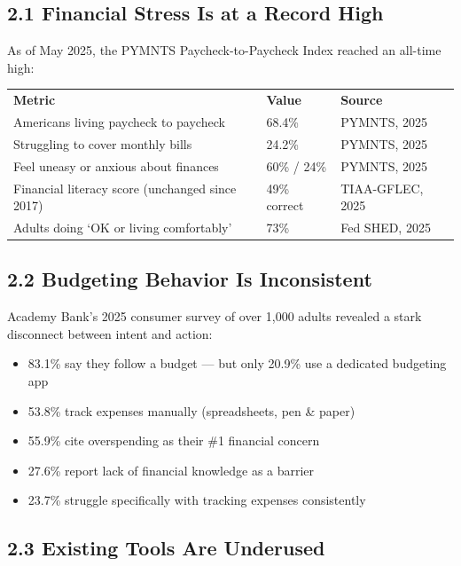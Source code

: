 \documentclass[11pt,a4paper]{article}
\begin{document}
\subsection{2.1 Financial Stress Is at a Record High}

As of May 2025, the PYMNTS Paycheck-to-Paycheck Index reached an all-time high:

\vspace{0.5em}
\begin{tabularx}{\textwidth}{L{7cm} L{3.5cm} L{4.5cm}}
\color{white}\textbf{Metric} & \color{white}\textbf{Value} & \color{white}\textbf{Source} \\
Americans living paycheck to paycheck & 68.4\% & PYMNTS, 2025 \\
Struggling to cover monthly bills & 24.2\% & PYMNTS, 2025 \\
Feel uneasy or anxious about finances & 60\% / 24\% & PYMNTS, 2025 \\
Financial literacy score (unchanged since 2017) & 49\% correct & TIAA-GFLEC, 2025 \\
Adults doing `OK or living comfortably' & 73\% & Fed SHED, 2025 \\
\end{tabularx}
\vspace{0.5em}

\subsection{2.2 Budgeting Behavior Is Inconsistent}

Academy Bank's 2025 consumer survey of over 1,000 adults revealed a stark disconnect
between intent and action:

\begin{itemize}
  \item 83.1\% say they follow a budget --- but only 20.9\% use a dedicated budgeting app
  \item 53.8\% track expenses manually (spreadsheets, pen \& paper)
  \item 55.9\% cite overspending as their \#1 financial concern
  \item 27.6\% report lack of financial knowledge as a barrier
  \item 23.7\% struggle specifically with tracking expenses consistently
\end{itemize}

\subsection{2.3 Existing Tools Are Underused}
\end{document}
